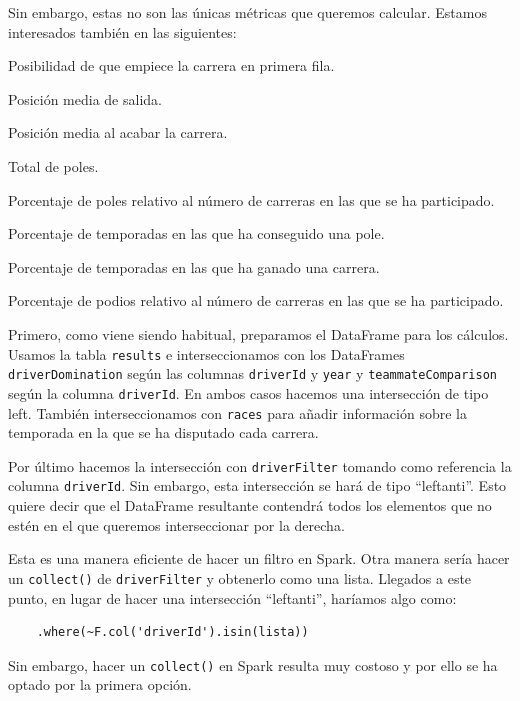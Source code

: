 \documentclass[12pt,twoside,titlepage]{report}
\newcommand{\quotes}[1]{``#1''}
\begin{document}
Sin embargo, estas no son las únicas métricas que queremos calcular. Estamos interesados también en las siguientes:

\begin{compactitem}
	\item Posibilidad de que empiece la carrera en primera fila.
	\item Posición media de salida.
	\item Posición media al acabar la carrera.
	\item Total de poles.
	\item Porcentaje de poles relativo al número de carreras en las que se ha participado.
	\item Porcentaje de temporadas en las que ha conseguido una pole.
	\item Porcentaje de temporadas en las que ha ganado una carrera.
	\item Porcentaje de podios relativo al número de carreras en las que se ha participado.
\end{compactitem}

Primero, como viene siendo habitual, preparamos el DataFrame para los cálculos. Usamos la tabla \texttt{results} e interseccionamos con los DataFrames \texttt{driverDomination} según las columnas \texttt{driverId} y \texttt{year} y \texttt{teammateComparison} según la columna \texttt{driverId}. En ambos casos hacemos una intersección de tipo left. También interseccionamos con \texttt{races} para añadir información sobre la temporada en la que se ha disputado cada carrera.

Por último hacemos la intersección con \texttt{driverFilter} tomando como referencia la columna \texttt{driverId}. Sin embargo, esta intersección se hará de tipo \quotes{leftanti}. Esto quiere decir que el DataFrame resultante contendrá todos los elementos que no estén en el que queremos interseccionar por la derecha.

Esta es una manera eficiente de hacer un filtro en Spark. Otra manera sería hacer un \texttt{collect()} de \texttt{driverFilter} y obtenerlo como una lista. Llegados a este punto, en lugar de hacer una intersección \quotes{leftanti}, haríamos algo como:

\begin{lstlisting}
	.where(~F.col('driverId').isin(lista))
\end{lstlisting}

Sin embargo, hacer un \texttt{collect()} en Spark resulta muy costoso y por ello se ha optado por la primera opción.
\end{document}
